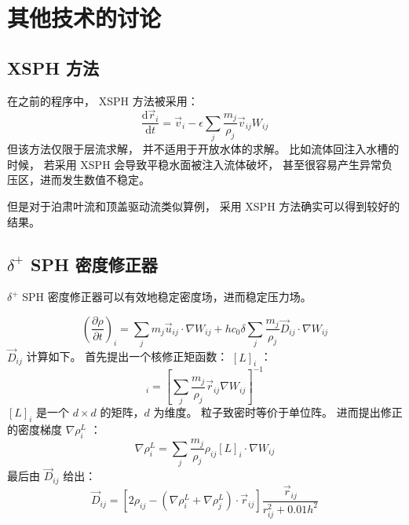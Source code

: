 \section{其他技术的讨论}

\subsection{XSPH 方法}

\begin{frame}
    在之前的程序中，
    XSPH 方法被采用：
    \begin{equation}
        \frac{\mathrm{d}\vec{r}_i}{\mathrm{d}t}=
        \vec{v}_i-
        \epsilon\sum_j
        \frac{m_j}{\rho_j}
        \vec{v}_{ij}W_{ij}
    \end{equation}
    但该方法仅限于层流求解，
    并不适用于开放水体的求解。
    比如流体回注入水槽的时候，
    若采用 XSPH 会导致平稳水面被注入流体破坏，
    甚至很容易产生异常负压区，进而发生数值不稳定。


    但是对于泊肃叶流和顶盖驱动流类似算例，
    采用 XSPH 方法确实可以得到较好的结果。
\end{frame}

\subsection{$\delta^+$ SPH 密度修正器}

\begin{frame}

$\delta^+$ SPH 密度修正器可以有效地稳定密度场，进而稳定压力场。

\begin{equation}
    \left(
        \frac{\partial \rho}{\partial t}
    \right)_i
    =
    \sum_j m_j \vec{u}_{ij} \cdot \nabla W_{ij}
    +
    h c_0 \delta
    \sum_j  \frac{m_j}{\rho_j} \vec{D}_{ij}\cdot \nabla W_{ij}
\end{equation}
$\vec{D}_{ij}$ 计算如下。 首先提出一个核修正矩函数：
$[L]_i$ ：
\begin{equation}
    [L]_i = \left[\sum_j \frac{m_j}{\rho_j}\vec{r}_{ij}\nabla W_{ij}\right]^{-1}
\end{equation}
$[L]_i$ 是一个 $d\times d$ 的矩阵，$d$ 为维度。
粒子致密时等价于单位阵。
进而提出修正的密度梯度 $\nabla \rho_i^L$ ：
\begin{equation}
    \nabla \rho_i^L = \sum_j \frac{m_j}{\rho_j}\rho_{ij}
    [L]_i \cdot \nabla W_{ij}
\end{equation}
最后由 $\vec{D}_{ij}$ 给出：
\begin{equation}
    \vec{D}_{ij} = 
    \left[
        2\rho_{ij} - 
        \left(
            \nabla \rho_i^L + \nabla \rho_j^L
        \right)\cdot \vec{r}_{ij}
    \right]
    \frac{\vec{r}_{ij}}{r_{ij}^2 + 0.01h^2}
\end{equation}
\end{frame}

